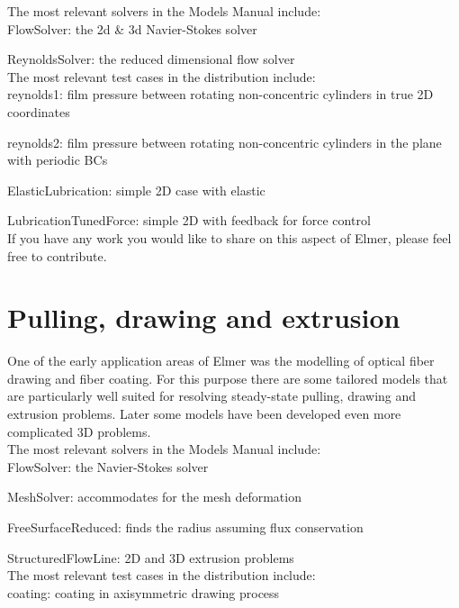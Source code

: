 \noindent The most relevant solvers in the Models Manual include:\\

    FlowSolver: the 2d \& 3d Navier-Stokes solver

    ReynoldsSolver: the reduced dimensional flow solver\\

\noindent The most relevant test cases in the distribution include:\\

    reynolds1: film pressure between rotating non-concentric cylinders in true 2D coordinates

    reynolds2: film pressure between rotating non-concentric cylinders in the plane with periodic BCs

    ElasticLubrication: simple 2D case with elastic

    LubricationTunedForce: simple 2D with feedback for force control\\

\noindent If you have any work you would like to share on this aspect of Elmer, please feel free to contribute. 

\section{Pulling, drawing and extrusion}

One of the early application areas of Elmer was the modelling of optical fiber drawing and fiber coating. For this purpose there are some tailored models that are particularly well suited for resolving steady-state pulling, drawing and extrusion problems. Later some models have been developed even more complicated 3D problems.\\

\noindent The most relevant solvers in the Models Manual include:\\

    FlowSolver: the Navier-Stokes solver

    MeshSolver: accommodates for the mesh deformation

    FreeSurfaceReduced: finds the radius assuming flux conservation

    StructuredFlowLine: 2D and 3D extrusion problems\\

\noindent The most relevant test cases in the distribution include:\\

    coating: coating in axisymmetric drawing process\\


